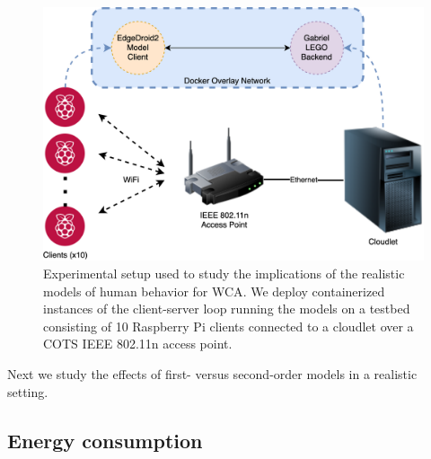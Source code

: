 
\begin{figure}
    \centering
    \includegraphics[width=\columnwidth]{figs/EdgeDroid2ExperimentalSetup.png}
    \caption{%
        Experimental setup used to study the implications of the realistic models of human behavior for \ac{WCA}.
        We deploy containerized instances of the client-server loop running the models on a testbed consisting of \num{10} Raspberry Pi clients connected to a cloudlet over a \ac{COTS} \acs{IEEE} \num{802.11}n access point.
    }\label{fig:expsetup}
\end{figure}

Next we study the effects of first- versus second-order models in a realistic setting.


\subsection{Energy consumption}


